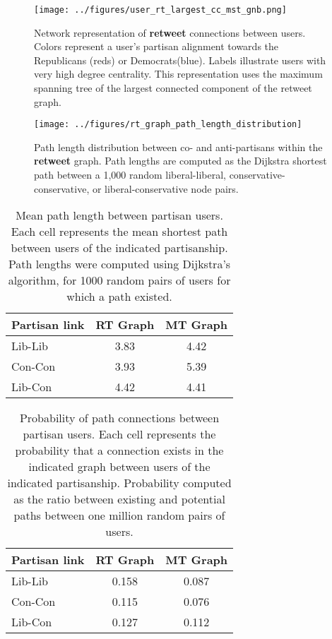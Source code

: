 \documentclass[11pt]{article}
\begin{document}
\begin{figure}[ht]
  \centering
  \texttt{[image: ../figures/user\_rt\_largest\_cc\_mst\_gnb.png]}
  \caption{Network representation of \textbf{retweet} connections between
    users. Colors represent a user's partisan alignment towards the
    Republicans (reds) or Democrats(blue). Labels illustrate users with
    very high degree centrality. This representation uses the maximum
    spanning tree of the largest connected component of the retweet graph.}
  \label{fig:rt-largest-cc-mst}
\end{figure}



\begin{figure}[ht]
  \centering
  \texttt{[image: ../figures/rt\_graph\_path\_length\_distribution]}
  \caption{Path length distribution between co- and anti-partisans within the \textbf{retweet} graph. Path lengths are computed as the Dijkstra shortest path between a 1,000 random liberal-liberal, conservative-conservative, or liberal-conservative node pairs. }
  \label{fig:rt-partisan-path-length}
\end{figure}

\begin{table}[ht]
  \centering
  \begin{tabular}[ht]{lcc}
    \hline
    Partisan link & RT Graph & MT Graph \\
    \hline
    Lib-Lib       & 3.83         & 4.42         \\
    Con-Con       & 3.93         & 5.39         \\
    Lib-Con       & 4.42         & 4.41         \\
    \hline
  \end{tabular}
  \caption{Mean path length between partisan users. Each cell
    represents the mean shortest path between users of the indicated
    partisanship. Path lengths were computed using Dijkstra's
    algorithm, for 1000 random pairs of
    users for which a path existed.}
  \label{tab:path-length}
\end{table}


\begin{table}[ht]
  \centering
  \begin{tabular}[ht]{lcc}
    \hline
    Partisan link & RT Graph & MT Graph \\
    \hline
    Lib-Lib       & 0.158         & 0.087         \\
    Con-Con       & 0.115         & 0.076         \\
    Lib-Con       & 0.127         & 0.112         \\
    \hline
  \end{tabular}
  \caption{Probability of path connections between partisan users. Each cell represents the probability that a connection exists in the indicated graph between users of the indicated partisanship. Probability computed as the ratio between existing and potential paths between one million random pairs of users. }
  \label{tab:path-prob}
\end{table}
\end{document}
